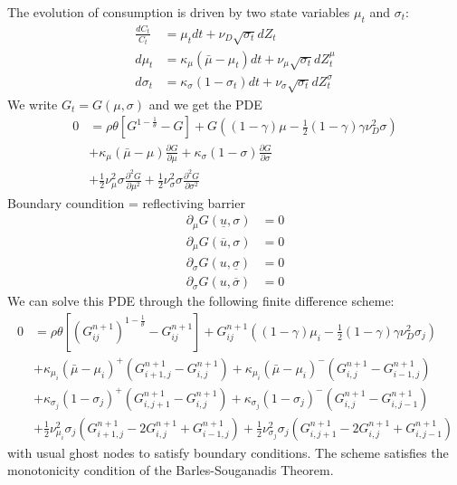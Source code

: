 \documentclass[english]{article}
\begin{document}
The evolution of consumption is driven by two state variables $\mu_{t}$ and $\sigma_{t}$:
\begin{align*}
	\frac{dC_{t}}{C_{t}} & =  \mu_{t}dt+\nu_{D}\sqrt{\sigma_{t}}dZ_{t}\\
	d\mu_{t} & =  \kappa_{\mu}(\bar{\mu}-\mu_{t})dt+\nu_{\mu}\sqrt{\sigma_{t}}dZ_{t}^{\mu}\\
	d\sigma_{t} & =  \kappa_{\sigma}(1-\sigma_{t})dt+\nu_{\sigma}\sqrt{\sigma_{t}}dZ_{t}^{\sigma}
\end{align*}
We write $G_t = G(\mu, \sigma)$ and we get the PDE
\begin{align*}
	0&= \rho \theta[G^{1-\frac{1}{\theta}}- G]+G((1-\gamma)\mu-\frac{1}{2}(1-\gamma)\gamma\nu_D^2\sigma)\\
	&+\kappa_{\mu}(\bar{\mu}-\mu)\frac{\partial G}{\partial\mu}+\kappa_{\sigma}(1-\sigma)\frac{\partial G}{\partial\sigma}\\
	&+\frac{1}{2}\nu_{\mu}^{2}\sigma\frac{\partial^{2}G}{\partial\mu^{2}}+\frac{1}{2}\nu_{\sigma}^{2}\sigma \frac{\partial^{2}G}{\partial\sigma^{2}}
\end{align*}
Boundary coundition  = reflectiving barrier
\begin{align*}
	\partial_\mu G(\underline{u}, \sigma) &= 0  \\
	\partial_\mu G(\overline{u}, \sigma) &= 0 \\
	\partial_\sigma G(u, \underline{\sigma}) &= 0  \\
	\partial_\sigma G(u, \overline{\sigma}) &= 0 
\end{align*}
We can solve this PDE through the following finite difference scheme:
\begin{align*}
	0&= \rho \theta[(G_{ij}^{n+1})^{1-\frac{1}{\theta}}- G_{ij}^{{n+1}}]+G_{ij}^{n+1}((1-\gamma)\mu_i-\frac{1}{2}(1-\gamma)\gamma\nu_D^2\sigma_j)\\
	&+\kappa_{\mu_i}(\bar{\mu}-\mu_i)^+(G_{i+1, j}^{n+1}-G_{i, j}^{n+1}) +\kappa_{\mu_i}(\bar{\mu}-\mu_i)^-(G_{i, j}^{n+1}-G_{i-1, j}^{n+1})\\
	&+\kappa_{\sigma_j}(1-\sigma_j)^+(G_{i, j+1}^{n+1}-G_{i,j}^{n+1}) +\kappa_{\sigma_j}(1-\sigma_j)^-(G_{i, j}^{n+1}-G_{i,j-1}^{n+1})\\
	&+\frac{1}{2}\nu_{\mu_i}^{2}\sigma_j(G_{i+1, j}^{n+1} - 2 G_{i, j}^{n+1} + G_{i-1, j}^{n+1})+\frac{1}{2}\nu_{\sigma_j}^{2}\sigma_j(G_{i, j+1}^{n+1} - 2 G_{i, j}^{n+1} + G_{i, j-1}^{n+1})
\end{align*}
with usual ghost nodes to satisfy boundary conditions.
The scheme satisfies the monotonicity condition of the Barles-Souganadis Theorem. 
\end{document}
